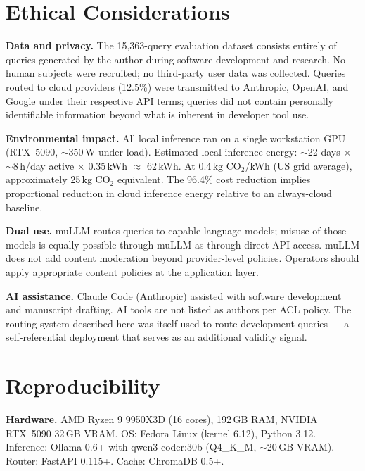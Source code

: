 \documentclass[11pt]{article}
\begin{document}
\section*{Ethical Considerations}

\textbf{Data and privacy.} The 15,363-query evaluation dataset consists
entirely of queries generated by the author during software development
and research. No human subjects were recruited; no third-party user data
was collected. Queries routed to cloud providers (12.5\%) were
transmitted to Anthropic, OpenAI, and Google under their respective API
terms; queries did not contain personally identifiable information beyond
what is inherent in developer tool use.

\textbf{Environmental impact.} All local inference ran on a single
workstation GPU (RTX~5090, $\sim$350\,W under load). Estimated local
inference energy: $\sim$22 days $\times$ $\sim$8\,h/day active $\times$
0.35\,kWh $\approx$ 62\,kWh. At 0.4\,kg CO$_2$/kWh (US grid average),
approximately 25\,kg CO$_2$ equivalent. The 96.4\% cost reduction
implies proportional reduction in cloud inference energy relative to an
always-cloud baseline.

\textbf{Dual use.} muLLM routes queries to capable language models;
misuse of those models is equally possible through muLLM as through
direct API access. muLLM does not add content moderation beyond
provider-level policies. Operators should apply appropriate content
policies at the application layer.

\textbf{AI assistance.} Claude Code (Anthropic) assisted with software
development and manuscript drafting. AI tools are not listed as authors
per ACL policy. The routing system described here was itself used to
route development queries --- a self-referential deployment that serves
as an additional validity signal.

\appendix

\section{Reproducibility}

\textbf{Hardware.} AMD Ryzen 9 9950X3D (16 cores), 192\,GB RAM, NVIDIA
RTX~5090 32\,GB VRAM. OS: Fedora Linux (kernel 6.12), Python 3.12.
Inference: Ollama 0.6+ with qwen3-coder:30b (Q4\_K\_M, $\sim$20\,GB
VRAM). Router: FastAPI 0.115+. Cache: ChromaDB 0.5+.
\end{document}
